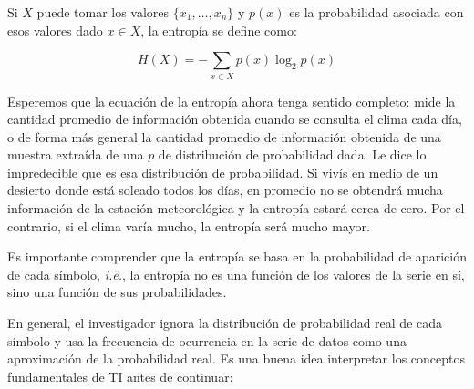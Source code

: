 \documentclass[a4paper,12pt]{article}
\begin{document}
Si $X$ puede tomar los valores $\{x_1, \dots, x_n\}$ y $p(x)$ es la probabilidad asociada con esos valores dado $x \in X$, la entropía se define como:

$$H(X) = - \sum_{x \in X} p(x) \log_2 p(x)$$

Esperemos que la ecuación de la entropía ahora tenga sentido completo: mide la cantidad promedio de información obtenida cuando se consulta el clima cada día, o  de forma más general la cantidad promedio de información obtenida de una muestra extraída de una $p$ de distribución de probabilidad dada. Le dice lo impredecible que es esa distribución de probabilidad. Si vivís en medio de un desierto donde está soleado todos los días, en promedio no se obtendrá mucha información de la estación meteorológica y la entropía estará cerca de cero. Por el contrario, si el clima varía mucho, la entropía será mucho mayor.


Es importante comprender que la entropía se basa en la probabilidad de aparición de cada símbolo, \textit{i.e.}, la entropía no es una función de los valores de la serie en sí, sino una función de sus probabilidades. 

En general, el investigador ignora la distribución de probabilidad real de cada símbolo y usa la frecuencia de ocurrencia en la serie de datos como una aproximación de la probabilidad real. Es una buena idea interpretar los conceptos fundamentales de TI antes de continuar:
\end{document}
